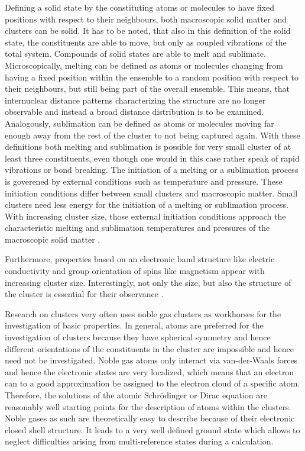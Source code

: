 Defining a solid state by the constituting atoms or molecules to have fixed
positions with respect to their neighbours, both macroscopic solid matter
and clusters can be solid. It has to be noted, that also in this definition
of the solid state, the constituents are able to move, but only as coupled
vibrations of the total system.
Compounds of solid states are able to melt and sublimate. Microscopically, melting 
can be defined as atoms or                                       
molecules changing from having a fixed position within the ensemble to a          
random position with respect to their neighbours, but still being part
of the overall ensemble. This means, that internuclear distance
patterns characterizing the
structure are no longer observable and instead a broad distance distribution
is to be examined.
Analogously, sublimation can be defined as atoms or molecules         
moving far enough away from the rest of the cluster to not being captured         
again.
With these definitions both melting and sublimation is possible for very
small cluster of at least three constituents, even though one would in this
case rather speak of rapid vibrations or bond breaking.
The initiation of a melting or a sublimation process is goverened by
external conditions such as temperature and pressure. These initiation
conditions differ between small clusters and macroscopic matter. Small clusters
need less energy for the initiation of a melting or sublimation process.
With increasing cluster size, those external initiation conditions
approach the characteristic melting and sublimation temperatures and pressures
of the macroscopic solid matter
\cite{Kaelberer77,Verkhovtseva03}. 

Furthermore, properties based on an electronic band structure like
electric conductivity and group orientation of spins like magnetism appear
with increasing cluster size. Interestingly, not only the size, but also the
structure of the cluster is essential for their observance
\cite{Benfield92}.

Research on clusters very often uses noble gas clusters as workhorses for
the investigation of basic properties.
In general, atoms are preferred for the investigation of clusters because
they have spherical symmetry and hence different orientations of the constituents
in the cluster are impossible and hence need not be investigated.
Noble gas atoms only interact via
van-der-Waals forces and hence the electronic states are very localized, which means
that an electron can to a good approximation be
assigned to the electron cloud of a specific atom.
Therefore, the solutions of the atomic Schrödinger or Dirac equation
are reasonably well starting points for the
description of atoms within the
clusters. 
Noble gases as such are theoretically easy to describe because of their
electronic closed shell structure.
It leads to a very well
defined ground state which allows to neglect difficulties arising from
multi-reference states during a calculation.

